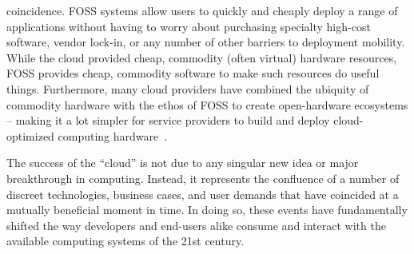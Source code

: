 \begin{packed_desc}
  coincidence. FOSS systems allow users to quickly and cheaply deploy
  a range of applications without having to worry about purchasing
  specialty high-cost software, vendor lock-in, or any number of other
  barriers to deployment mobility. While the cloud provided cheap,
  commodity (often virtual) hardware resources, FOSS provides cheap,
  commodity software to make such resources do useful
  things. Furthermore, many cloud providers have combined the ubiquity
  of commodity hardware with the ethos of FOSS to create open-hardware
  ecosystems -- making it a lot simpler for service providers to build
  and deploy cloud-optimized computing hardware~\cite{opencompute}.
\end{packed_desc}

The success of the ``cloud'' is not due to any singular new idea or
major breakthrough in computing. Instead, it represents the confluence
of a number of discreet technologies, business cases, and user demands
that have coincided at a mutually beneficial moment in time. In doing
so, these events have fundamentally shifted the way developers and
end-users alike consume and interact with the available computing
systems of the 21st century.

